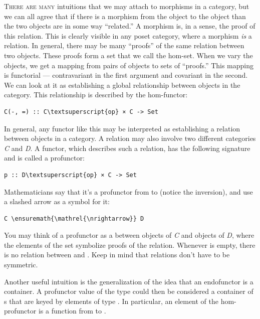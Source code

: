 \lettrine[lhang=0.17]{T}{here are many} intuitions that we may attach to morphisms in a category,
but we can all agree that if there is a morphism from the object
 to the object  than the two objects are in some way
``related.'' A morphism is, in a sense, the proof of this relation. This
is clearly visible in any poset category, where a morphism \emph{is} a
relation. In general, there may be many ``proofs'' of the same relation
between two objects. These proofs form a set that we call the hom-set.
When we vary the objects, we get a mapping from pairs of objects to sets
of ``proofs.'' This mapping is functorial --- contravariant in the first
argument and covariant in the second. We can look at it as establishing
a global relationship between objects in the category. This relationship
is described by the hom-functor:

\begin{Verbatim}[commandchars=\\\{\}]
C(-, =) :: C\textsuperscript{op} × C -> Set
\end{Verbatim}
In general, any functor like this may be interpreted as establishing a
relation between objects in a category. A relation may also involve two
different categories \emph{C} and \emph{D}. A functor, which describes
such a relation, has the following signature and is called a profunctor:

\begin{Verbatim}[commandchars=\\\{\}]
p :: D\textsuperscript{op} × C -> Set
\end{Verbatim}
Mathematicians say that it's a profunctor from  to 
(notice the inversion), and use a slashed arrow as a symbol for it:

\begin{Verbatim}[commandchars=\\\{\}]
C \ensuremath{\mathrel{\nrightarrow}} D
\end{Verbatim}
You may think of a profunctor as a 
between objects of \emph{C} and objects of \emph{D}, where the elements
of the set symbolize proofs of the relation. Whenever 
is empty, there is no relation between  and . Keep
in mind that relations don't have to be symmetric.

Another useful intuition is the generalization of the idea that an
endofunctor is a container. A profunctor value of the type
 could then be considered a container of s
that are keyed by elements of type . In particular, an element
of the hom-profunctor is a function from  to .

